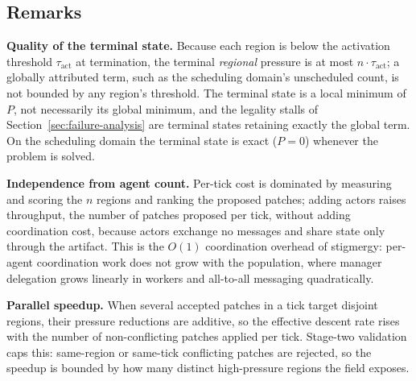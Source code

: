 \subsection{Remarks}

\textbf{Quality of the terminal state.} Because each region is below the activation threshold $\tau_{\text{act}}$ at termination, the terminal \emph{regional} pressure is at most $n \cdot \tau_{\text{act}}$; a globally attributed term, such as the scheduling domain's unscheduled count, is not bounded by any region's threshold. The terminal state is a local minimum of $P$, not necessarily its global minimum, and the legality stalls of Section~\ref{sec:failure-analysis} are terminal states retaining exactly the global term. On the scheduling domain the terminal state is exact ($P = 0$) whenever the problem is solved.

\textbf{Independence from agent count.} Per-tick cost is dominated by measuring and scoring the $n$ regions and ranking the proposed patches; adding actors raises throughput, the number of patches proposed per tick, without adding coordination cost, because actors exchange no messages and share state only through the artifact. This is the $O(1)$ coordination overhead of stigmergy: per-agent coordination work does not grow with the population, where manager delegation grows linearly in workers and all-to-all messaging quadratically.

\textbf{Parallel speedup.} When several accepted patches in a tick target disjoint regions, their pressure reductions are additive, so the effective descent rate rises with the number of non-conflicting patches applied per tick. Stage-two validation caps this: same-region or same-tick conflicting patches are rejected, so the speedup is bounded by how many distinct high-pressure regions the field exposes.
